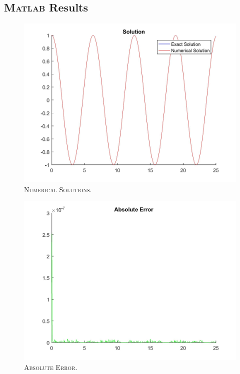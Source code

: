 \documentclass[a4paper,oneside]{book}
\numberwithin{equation}{chapter}
\begin{document}
\subsection{\textsc{Matlab} Results}
\begin{figure}[H]
\centering
\includegraphics[scale=0.18]{im1}
\caption{\textsc{Numerical Solutions.}}
\end{figure}
\begin{figure}[H]
\centering
\includegraphics[scale=0.18]{im2}
\caption{\textsc{Absolute Error.}}
\end{figure}
\end{document}
